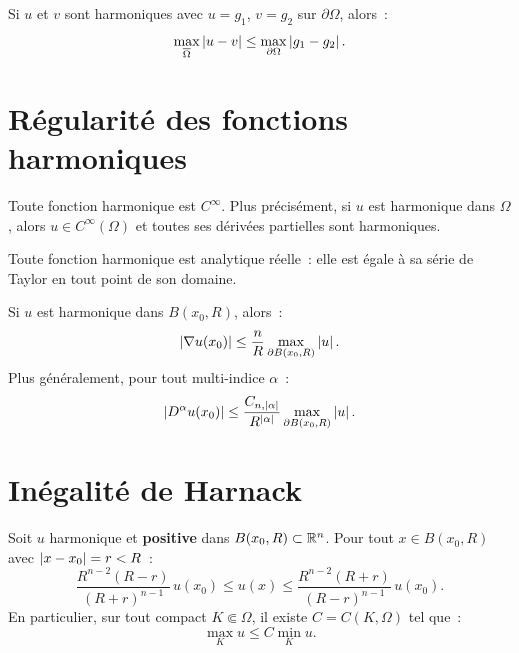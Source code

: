 \begin{corollaire}[Stabilit\'e]
Si $u$ et $v$ sont harmoniques avec $u = g_1$, $v = g_2$ sur
$\partial\Omega$, alors~:
\[
    \max_{\overline{\Omega}} \left| u - v \right| \leq \max_{\partial\Omega} \left| g_1 - g_2 \right|.
\]
\end{corollaire}

\section{R\'egularit\'e des fonctions harmoniques}

\begin{theoreme}
\label{thm:regularite_harmonique}
Toute fonction harmonique est $C^\infty$. Plus pr\'ecis\'ement, si $u$
est harmonique dans $\Omega$, alors $u \in C^\infty(\Omega)$ et
toutes ses d\'eriv\'ees partielles sont harmoniques.
\end{theoreme}

\begin{theoreme}[Analyticit\'e]
Toute fonction harmonique est analytique r\'eelle~: elle est \'egale \`a
sa s\'erie de Taylor en tout point de son domaine.
\end{theoreme}

\begin{theoreme}
Si $u$ est harmonique dans $B(x_0, R)$, alors~:
\begin{equation}\label{eq:estimation_gradient}
    \left| \nabla u(x_0) \right| \leq \frac{n}{R}\max_{\partial B(x_0,R)} \left| u \right|.
\end{equation}
Plus g\'en\'eralement, pour tout multi-indice $\alpha$~:
\[
    \left| D^\alpha u(x_0) \right| \leq \frac{C_{n,\left| \alpha \right|}}{R^{\left| \alpha \right|}}
    \max_{\partial B(x_0,R)} \left| u \right|.
\]
\end{theoreme}

\section{In\'egalit\'e de Harnack}

\begin{theoreme}
Soit $u$ harmonique et \textbf{positive} dans $B(x_0, R) \subset \mathbb{R}^n$.
Pour tout $x \in B(x_0, R)$ avec $\left| x - x_0 \right| = r < R$~:
\begin{equation}\label{eq:harnack}
    \frac{R^{n-2}(R-r)}{(R+r)^{n-1}}\, u(x_0) \leq u(x)
    \leq \frac{R^{n-2}(R+r)}{(R-r)^{n-1}}\, u(x_0).
\end{equation}
En particulier, sur tout compact $K \Subset \Omega$, il existe $C = C(K, \Omega)$
tel que~:
\[
    \max_K u \leq C \min_K u.
\]
\end{theoreme}

